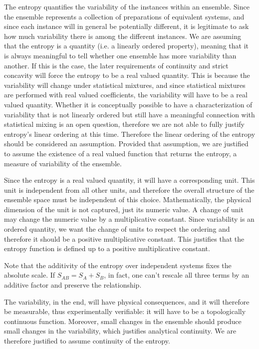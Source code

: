 \begin{mathSection}
\begin{justification}
	The entropy quantifies the variability of the instances within an ensemble. Since the ensemble represents a collection of preparations of equivalent systems, and since each instance will in general be potentially different, it is legitimate to ask how much variability there is among the different instances. We are assuming that the entropy is a quantity (i.e. a linearly ordered property), meaning that it is always meaningful to tell whether one ensemble has more variability than another. If this is the case, the later requirements of continuity and strict concavity will force the entropy to be a real valued quantity. This is because the variability will change under statistical mixtures, and since statistical mixtures are performed with real valued coefficients, the variability will have to be a real valued quantity. Whether it is conceptually possible to have a characterization of variability that is not linearly ordered but still have a meaningful connection with statistical mixing is an open question, therefore we are not able to fully justify entropy's linear ordering at this time. Therefore the linear ordering of the entropy should be considered an assumption. Provided that assumption, we are justified to assume the existence of a real valued function that returns the entropy, a measure of variability of the ensemble.
	
	Since the entropy is a real valued quantity, it will have a corresponding unit. This unit is independent from all other units, and therefore the overall structure of the ensemble space must be independent of this choice. Mathematically, the physical dimension of the unit is not captured, just its numeric value. A change of unit may change the numeric value by a multiplicative constant. Since variability is an ordered quantity, we want the change of units to respect the ordering and therefore it should be a positive multiplicative constant. This justifies that the entropy function is defined up to a positive multiplicative constant.
	
	Note that the additivity of the entropy over independent systems fixes the absolute scale. If $S_{AB} = S_A + S_B$, in fact, one can't rescale all three terms by an additive factor and preserve the relationship.
	
	The variability, in the end, will have physical consequences, and it will therefore be measurable, thus experimentally verifiable: it will have to be a topologically continuous function. Moreover, small changes in the ensemble should produce small changes in the variability, which justifies analytical continuity. We are therefore justified to assume continuity of the entropy.
	

\end{justification}
\end{mathSection}

